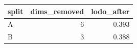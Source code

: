 \begin{tabular}{lrr}
\toprule
split & dims\_removed & lodo\_after \\
\midrule
A & 6 & 0.393 \\
B & 3 & 0.388 \\
\bottomrule
\end{tabular}

